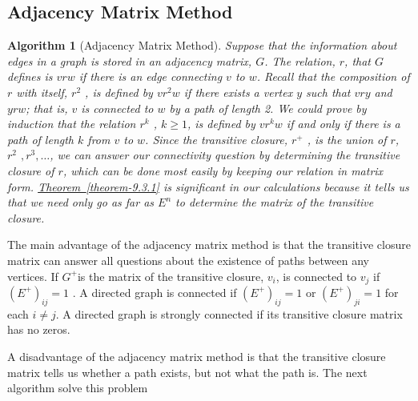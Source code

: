 \documentclass[10pt,]{book}
\theoremstyle{plain}
\newtheorem{algorithm}[theorem]{Algorithm}
\theoremstyle{definition}
\theoremstyle{definition}
\theoremstyle{definition}
\theoremstyle{definition}
\theoremstyle{definition}
\numberwithin{equation}{section}
\begin{document}
\subsection[Adjacency Matrix Method]{Adjacency Matrix Method}\label{ss-adjacency-matrix-method}
\begin{algorithm}[Adjacency Matrix Method]\label{algorithm-1}
Suppose that the information about edges in a graph is stored in an adjacency matrix, \(G\). The
relation, \(r\), that \(G\) defines is \(v r w\) if there is an edge connecting \(v\) to \(w\). Recall that the composition
of \(r\) with itself, \(r^2\) , is defined by \(v r^2 w\) if there exists a vertex \(y\) such that \(v r y\) and \(y r w\); that is,
\(v\) is connected to \(w\) by a path of length 2. We could prove by induction that the relation \(r^k\) , \(k\geq 1\), is defined by
\(v r^k w\) if and only if there is a path of length \(k\) from \(v\) to \(w\). Since the transitive closure, \(r^+\) , is the
union of \(r\), \(r^2\) \(,r^3,\ldots\), we can answer our connectivity question by determining the transitive closure of \(r\), which
can be done most easily by keeping our relation in matrix form. \hyperref[theorem-9.3.1]{Theorem~\ref{theorem-9.3.1}} is significant in our calculations because it tells us that we need
only go as far as \(E^n\) to determine the matrix of the transitive closure. %
\end{algorithm}
The main advantage of the adjacency matrix method is that the transitive closure matrix can answer all questions about the existence of paths between any 
vertices. If \(G^+\)is the matrix of the transitive closure, \(v_i\), is connected to \(v_j\) if \(\left(E^+\right)_{i j }=1\) . A directed
graph is connected if \(\left(E^+\right)_{i j }=1\) or \(\left(E^+\right)_{j i}=1\) for each \(i\neq j\). A directed graph is strongly connected
if its transitive closure matrix has no zeros.%
\par
A disadvantage of the adjacency matrix method is that the transitive closure matrix tells us whether a path exists, but not what the path is.  The next algorithm solve this problem%
\typeout{************************************************}
\typeout{************************************************}
\end{document}
